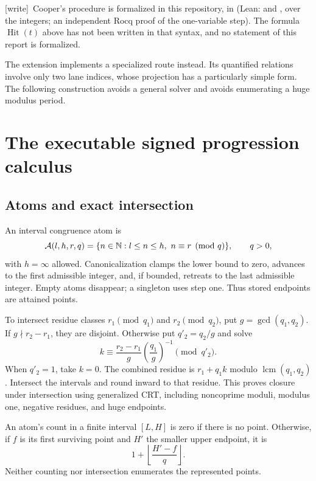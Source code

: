 \documentclass[11pt,letterpaper]{article}
\theoremstyle{definition}\newtheorem{definition}[theorem]{Definition}
\theoremstyle{remark}\newtheorem{remark}[theorem]{Remark}
\newcommand{\lcm}{\operatorname{lcm}}\newcommand{\rank}{\operatorname{rank}}
\newcommand{\wtag}{\textup{[write]}}
\begin{document}
{\small\wtag\ Cooper's procedure is formalized in this repository, in
 (Lean:
 and
, over the
integers; an independent Rocq proof of the one-variable step). The formula
$\operatorname{Hit}(t)$ above has not been written in that syntax, and no
statement of this report is formalized.\par}

The extension implements a specialized route instead. Its quantified relations involve only two lane indices, whose projection has a particularly simple form. The following construction avoids a general solver and avoids enumerating a huge modulus period.

\section{The executable signed progression calculus}\label{ptr:sec:calculus}
\subsection{Atoms and exact intersection}
An interval congruence atom is
\begin{equation}\label{ptr:eq:atom}
 \mathcal A(l,h,r,q)=\{n\in\mathbb N:l\le n\le h,\ n\equiv r\pmod q\},
 \qquad q>0,
\end{equation}
with $h=\infty$ allowed. Canonicalization clamps the lower bound to zero, advances to the first admissible integer, and, if bounded, retreats to the last admissible integer. Empty atoms disappear; a singleton uses step one. Thus stored endpoints are attained points.

To intersect residue classes $r_1\pmod{q_1}$ and $r_2\pmod{q_2}$, put $g=\gcd(q_1,q_2)$. If $g\nmid r_2-r_1$, they are disjoint. Otherwise put $q'_2=q_2/g$ and solve
\[
 k\equiv\frac{r_2-r_1}{g}\left(\frac{q_1}{g}\right)^{-1}\pmod{q'_2}.
\]
When $q'_2=1$, take $k=0$. The combined residue is $r_1+q_1k$ modulo $\lcm(q_1,q_2)$. Intersect the intervals and round inward to that residue. This proves closure under intersection using generalized CRT, including noncoprime moduli, modulus one, negative residues, and huge endpoints.

An atom's count in a finite interval $[L,H]$ is zero if there is no point. Otherwise, if $f$ is its first surviving point and $H'$ the smaller upper endpoint, it is
\begin{equation}\label{ptr:eq:count}
 1+\left\lfloor\frac{H'-f}{q}\right\rfloor.
\end{equation}
Neither counting nor intersection enumerates the represented points.
\end{document}
